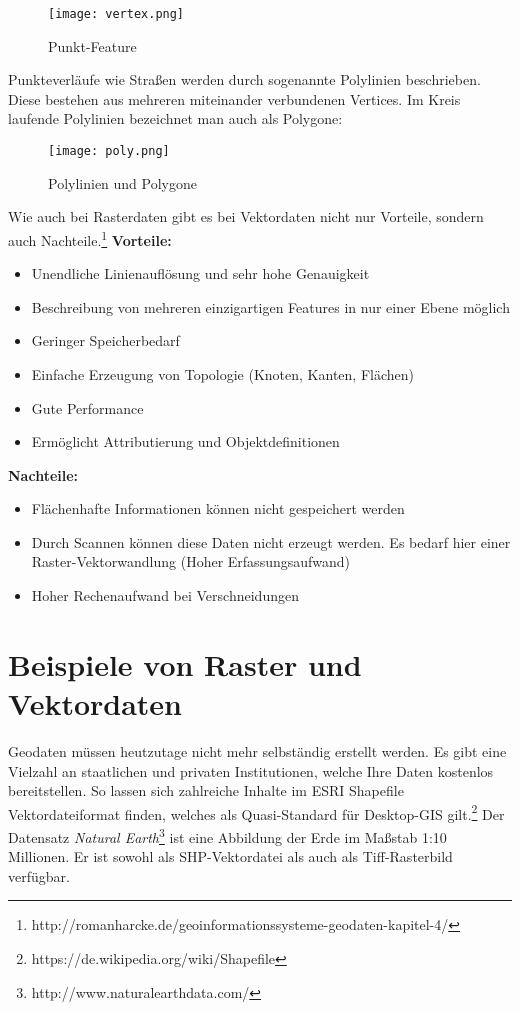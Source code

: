 \documentclass[11pt,fleqn]{book} %
\begin{document}
\begin{figure}[H]
\centering
\texttt{[image: vertex.png]}
\caption{Punkt-Feature \protect\footnotemark}
\end{figure}


\noindent
Punkteverläufe wie Straßen werden durch sogenannte Polylinien beschrieben. Diese bestehen aus mehreren miteinander verbundenen Vertices. Im Kreis laufende Polylinien bezeichnet man auch als Polygone:

\begin{figure}[H]
\centering
\texttt{[image: poly.png]}
\caption{Polylinien und Polygone \protect\footnotemark}
\end{figure}


\noindent
Wie auch bei Rasterdaten gibt es bei Vektordaten nicht nur Vorteile, sondern auch Nachteile.\footnote{http://romanharcke.de/geoinformationssysteme-geodaten-kapitel-4/}\newline
\textbf{Vorteile:}
\begin{itemize}
\item Unendliche Linienauflösung und sehr hohe Genauigkeit
\item Beschreibung von mehreren einzigartigen Features in nur einer Ebene möglich
\item Geringer Speicherbedarf
\item Einfache Erzeugung von Topologie (Knoten, Kanten, Flächen)
\item Gute Performance
\item Ermöglicht Attributierung und Objektdefinitionen
\end{itemize}
\textbf{Nachteile:}
\begin{itemize}
\item Flächenhafte Informationen können nicht gespeichert werden 
\item Durch Scannen können diese Daten nicht erzeugt werden. Es bedarf hier einer Raster-Vektorwandlung (Hoher Erfassungsaufwand)
\item Hoher Rechenaufwand bei Verschneidungen
\end{itemize}

\section{Beispiele von Raster und Vektordaten}
Geodaten müssen heutzutage nicht mehr selbständig erstellt werden. Es gibt eine Vielzahl an staatlichen und privaten Institutionen, welche Ihre Daten kostenlos bereitstellen. So lassen sich zahlreiche Inhalte im ESRI Shapefile Vektordateiformat finden, welches als Quasi-Standard für Desktop-GIS gilt.\footnote{https://de.wikipedia.org/wiki/Shapefile}
\noindent
Der Datensatz \textit{Natural Earth}\footnote{http://www.naturalearthdata.com/} ist eine Abbildung der Erde im Maßstab 1:10 Millionen. Er ist sowohl als SHP-Vektordatei als auch als Tiff-Rasterbild verfügbar.
\end{document}
